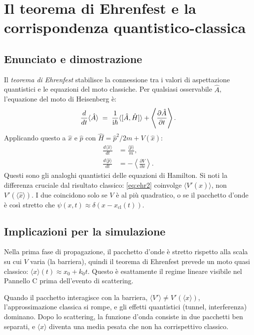 \documentclass[12pt, a4paper]{article}
\newcommand{\ii}{\mathrm{i}}          %
\begin{document}
\section{Il teorema di Ehrenfest e la corrispondenza quantistico-classica}
\label{app:ehrenfest}

\subsection{Enunciato e dimostrazione}

Il \emph{teorema di Ehrenfest} stabilisce la connessione tra i valori
di aspettazione quantistici e le equazioni del moto classiche. Per
qualsiasi osservabile $\hat{A}$, l'equazione del moto di Heisenberg è:
\begin{equation}
  \frac{d}{dt}\langle\hat{A}\rangle \;=\;
  \frac{1}{\ii\hbar}\langle[\hat{A},\hat{H}]\rangle
  + \left\langle\pdv{\hat{A}}{t}\right\rangle.
\end{equation}
Applicando questo a $\hat{x}$ e $\hat{p}$ con $\hat{H} = \hat{p}^2/2m + V(\hat{x})$:
\begin{align}
  \frac{d\langle\hat{x}\rangle}{dt}
  &= \frac{\langle\hat{p}\rangle}{m}, \label{eq:ehr1} \\
  \frac{d\langle\hat{p}\rangle}{dt}
  &= -\left\langle\frac{\partial V}{\partial x}\right\rangle. \label{eq:ehr2}
\end{align}
Questi sono gli analoghi quantistici delle equazioni di Hamilton. Si noti
la differenza cruciale dal risultato classico: \eqref{eq:ehr2} coinvolge
$\langle V'(\hat{x})\rangle$, non $V'(\langle\hat{x}\rangle)$.
I due coincidono solo se $V$ è al più quadratico, o se il pacchetto d'onde
è così stretto che $\psi(x,t) \approx \delta(x - x_\text{cl}(t))$.

\subsection{Implicazioni per la simulazione}

Nella prima fase di propagazione, il pacchetto d'onde è stretto rispetto
alla scala su cui $V$ varia (la barriera), quindi il teorema di Ehrenfest
prevede un moto quasi classico: $\langle x\rangle(t) \approx
x_0 + k_0 t$. Questo è esattamente il regime lineare visibile nel Pannello C
prima dell'evento di scattering.

Quando il pacchetto interagisce con la barriera, $\langle V'\rangle \neq
V'(\langle x\rangle)$, l'approssimazione classica si rompe, e gli effetti
quantistici (tunnel, interferenza) dominano. Dopo lo scattering, la funzione
d'onda consiste in due pacchetti ben separati, e $\langle x\rangle$ diventa
una media pesata che non ha corrispettivo classico.
\end{document}
